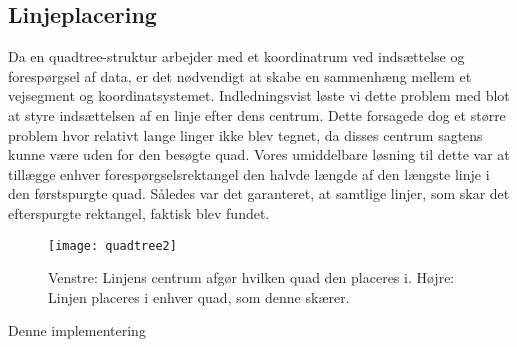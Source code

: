 \subsection{Linjeplacering}
Da en quadtree-struktur arbejder med et koordinatrum ved indsættelse og forespørgsel af data, er det nødvendigt at skabe en sammenhæng mellem et vejsegment og koordinatsystemet. Indledningsvist løste vi dette problem med blot at styre indsættelsen af en linje efter dens centrum. Dette forsagede dog et større problem hvor relativt lange linger ikke blev tegnet, da disses centrum sagtens kunne være uden for den besøgte quad. Vores umiddelbare løsning til dette var at tillægge enhver forespørgselsrektangel den halvde længde af den længste linje i den førstspurgte quad. Således var det garanteret, at samtlige linjer, som skar det efterspurgte rektangel, faktisk blev fundet.
\begin{figure}[ht]
	\centering
	\texttt{[image: quadtree2]}
	\captionsetup{width=0.8\textwidth}
	\caption{Venstre: Linjens centrum afgør hvilken quad den placeres i. Højre: Linjen placeres i enhver quad, som denne skærer.}
	\label{fig:quadtree2}
\end{figure}
Denne implementering 